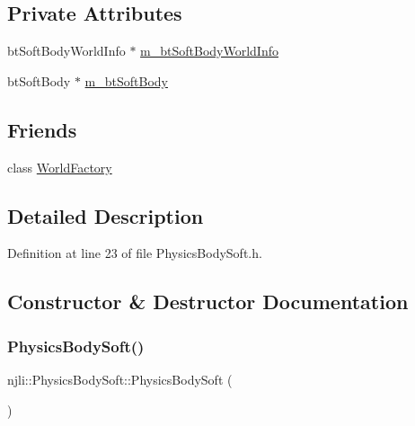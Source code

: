 \subsection*{Private Attributes}
\begin{DoxyCompactItemize}
\item 
bt\+Soft\+Body\+World\+Info $\ast$ \mbox{\hyperlink{classnjli_1_1_physics_body_soft_a3a3770a0489d8629de7b88de0c79fad3}{m\+\_\+bt\+Soft\+Body\+World\+Info}}
\item 
bt\+Soft\+Body $\ast$ \mbox{\hyperlink{classnjli_1_1_physics_body_soft_a5cc839e65a947ce67d81141aceffff53}{m\+\_\+bt\+Soft\+Body}}
\end{DoxyCompactItemize}
\subsection*{Friends}
\begin{DoxyCompactItemize}
\item 
class \mbox{\hyperlink{classnjli_1_1_physics_body_soft_acb96ebb09abe8f2a37a915a842babfac}{World\+Factory}}
\end{DoxyCompactItemize}


\subsection{Detailed Description}


Definition at line 23 of file Physics\+Body\+Soft.\+h.



\subsection{Constructor \& Destructor Documentation}
\mbox{\label{classnjli_1_1_physics_body_soft_ad1a57cd27522290455d696bcf9a797d0}} 
\subsubsection{\texorpdfstring{Physics\+Body\+Soft()}{PhysicsBodySoft()}\hspace{0.1cm}{\footnotesize\ttfamily [1/3]}}
{\footnotesize\ttfamily njli\+::\+Physics\+Body\+Soft\+::\+Physics\+Body\+Soft (\begin{DoxyParamCaption}{ }\end{DoxyParamCaption})\hspace{0.3cm}{\ttfamily [protected]}}


